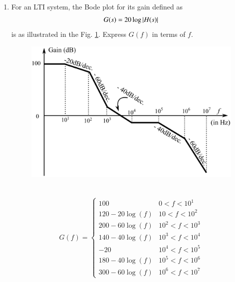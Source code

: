 \begin{enumerate}[label=\thesection.\arabic*.,ref=\thesection.\theenumi]

\item For an LTI system, the Bode plot for its gain defined as
\begin{align}
	G(s) = 20\log\abs{H(s)}
	\label{eq:ee18btech11001_gain}
\end{align}
is as illustrated in the Fig. \ref{fig:ee18btech11001_bode}. Express $G(f)$ in terms of $f$.\\
\begin{figure}[ht!]
    \includegraphics[width=\columnwidth]{./figs/ee18btech11001/ee18btech11001.eps}
    \caption{}
    \label{fig:ee18btech11001_bode}
\end{figure}\\

\solution
\begin{align}
 G(f) = 
 \begin{cases} 
        100 & 0 < f < 10^{1} \\
      120-20\log(f) & 10 < f < 10^{2} \\
      200-60\log(f) & 10^2 < f < 10^{3} \\
      140-40\log(f) & 10^{3} < f < 10^{4} \\
       -20 & 10^{4} < f < 10^{5} \\
      180-40\log(f) & 10^{5} < f < 10^{6} \\
      300-60\log(f) & 10^{6} < f < 10^{7}   
 \end{cases}
\end{align}



\end{enumerate}
